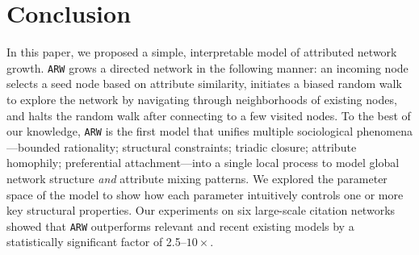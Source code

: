 \vspace{-6pt}
\section{Conclusion}
\label{sec:Conclusion}
In this paper, we proposed a simple, interpretable model of attributed network
growth. \texttt{ARW} grows a directed network in the following manner: an
incoming node selects a seed node based on attribute similarity, initiates a
biased random walk to explore the network by navigating through neighborhoods of
existing nodes, and halts the random walk after connecting to a few visited
nodes. To the best of our knowledge, \texttt{ARW} is the first model that
unifies multiple sociological phenomena---bounded rationality; structural
constraints; triadic closure; attribute homophily; preferential
attachment---into a single local process to model global network structure
\textit{and} attribute mixing patterns.
We explored the parameter space of the model to show how each parameter
intuitively controls one or more key structural properties.
Our experiments on six
large-scale citation networks showed that \texttt{ARW} outperforms
relevant and recent existing models by a statistically significant
factor of 2.5--$10\times$.
